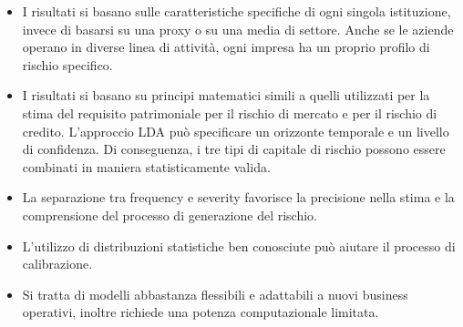 \documentclass[titlepage]{article}
\begin{document}
\begin{itemize}
\begin{itemize}
	\item 	I risultati si basano sulle caratteristiche specifiche di ogni singola istituzione, invece di basarsi su una proxy o su una media di settore. Anche se le aziende operano in diverse linea di attività, ogni impresa ha un proprio profilo di rischio specifico.  
	\item 	I risultati si basano su principi matematici simili a quelli utilizzati per la stima del requisito patrimoniale per il rischio di mercato e per il rischio di credito. L'approccio LDA può specificare un orizzonte temporale e un livello di confidenza. Di conseguenza, i tre tipi di capitale di rischio possono essere combinati in maniera statisticamente valida.  
	\item 	La separazione tra frequency e severity favorisce la precisione nella stima e la comprensione del processo di generazione del rischio.  
	\item 	L’utilizzo di distribuzioni statistiche ben conosciute può aiutare il processo di calibrazione.  
	\item 	Si tratta di modelli abbastanza flessibili e adattabili a nuovi business operativi, inoltre richiede una potenza computazionale limitata.
\end{itemize}


\end{itemize}
\end{document}
